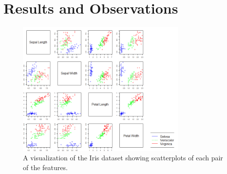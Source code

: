 \documentclass{article}
\begin{document}
\color{orange}
\section{Results and Observations}

\begin{figure}[H]
	\centering
	\includegraphics[width=0.75\textwidth]{iris_colored.png}
	\caption{A visualization of the Iris dataset showing scatterplots of each pair of the features.}
	\label{fig:iris_colored}
\end{figure}
\end{document}

